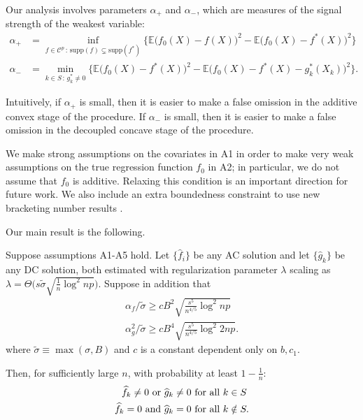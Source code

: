 Our analysis involves parameters $\alpha_+$ and $\alpha_-$,
which are measures of the signal strength of the weakest variable:
\begin{align*}
\alpha_+ &= \inf_{f \in \mathcal{C}^p \,:\, \textrm{supp}(f)\subsetneq \textrm{supp}(f^*)} 
       \Big\{ \mathbb{E} \big( f_0(X) - f(X) \big)^2 - 
        \mathbb{E} \big( f_0(X) - f^*(X) \big)^2  \Big\}\\
\alpha_- &=   \min_{k \in S \,:\, g^*_k \neq 0}
      \Big\{ \mathbb{E} \big( f_0(X) - f^*(X) \big)^2 - 
    \mathbb{E} \big( f_0(X) - f^*(X) - g^*_k(X_k) \big)^2 \Big\}.
\end{align*}

 Intuitively, if $\alpha_+$ is small, then it is easier to make a
false omission in the additive convex stage of the procedure. If
$\alpha_-$ is small, then it is easier to make a false omission in
the decoupled concave stage of the procedure.

We make strong assumptions on the covariates in A1 in order to make
very weak assumptions on the true regression function $f_0$ in
A2; in particular, we do not assume that $f_0$ is additive. 
Relaxing this condition is an important direction for future work.
We also include an extra
boundedness constraint to use new bracketing number
results \citep{kim2014global}.

Our main result is the following.
\begin{stheorem}
Suppose assumptions A1-A5 hold. Let $\{\hat{f}_i\}$ be any AC solution and
let $\{\hat{g}_k\}$ be any DC solution, both estimated with 
regularization parameter $\lambda$ scaling as
$\lambda = \Theta \Big( s\tilde{\sigma} \sqrt{\frac{1}{n} \log^2 np} \Big)$. 
Suppose in addition that
\begin{gather}
\alpha_f/\tilde{\sigma} \geq c B^2 \sqrt{\frac{s^5}{n^{4/5}} \log^2
  np}\\
\alpha_g^2/\tilde{\sigma} \geq c B^4 \sqrt{\frac{s^5}{n^{4/5}}
  \log^2 2np}.
\end{gather} 
where $\tilde{\sigma} \equiv \max(\sigma, B)$ and $c$ is a constant dependent only on $b, c_1$.

Then, for sufficiently large $n$, with probability at least $1-\frac{1}{n}$:
\begin{align*}
\widehat{f}_k \neq 0 \textrm{ or } \widehat{g}_k \neq 0 &\textrm{ for all } k \in S\\
\widehat{f}_k = 0 \textrm{ and } \widehat{g}_k = 0 & \textrm{ for all } k \notin S.
\end{align*}


\end{stheorem}

